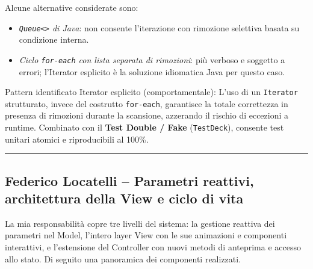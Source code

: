 \documentclass[11pt, a4paper, oneside]{report}
\begin{document}
Alcune alternative considerate sono:
\begin{itemize}
    \item \emph{\texttt{Queue<>} di Java}: non consente l'iterazione con rimozione selettiva basata su condizione interna.
    \item \emph{Ciclo \texttt{for-each} con lista separata di rimozioni}: più verboso e soggetto a errori; l'Iterator esplicito è la soluzione idiomatica Java per questo caso.
\end{itemize}

Pattern identificato Iterator esplicito (comportamentale): L'uso di un \texttt{Iterator} strutturato, invece del costrutto \texttt{for-each}, garantisce la totale correttezza in presenza di rimozioni durante la scansione, azzerando il rischio di eccezioni a runtime. Combinato con il \textbf{Test Double / Fake} (\texttt{TestDeck}), consente test unitari atomici e riproducibili al 100\%.

\bigskip\noindent\rule{\linewidth}{0.4pt}\bigskip

\subsection{Federico Locatelli -- Parametri reattivi, architettura della View e ciclo di vita}

La mia responsabilità copre tre livelli del sistema: la gestione reattiva
dei parametri nel Model, l'intero layer View con le sue animazioni e
componenti interattivi, e l'estensione del Controller con nuovi metodi
di anteprima e accesso allo stato. Di seguito una panoramica dei
componenti realizzati.
\end{document}

